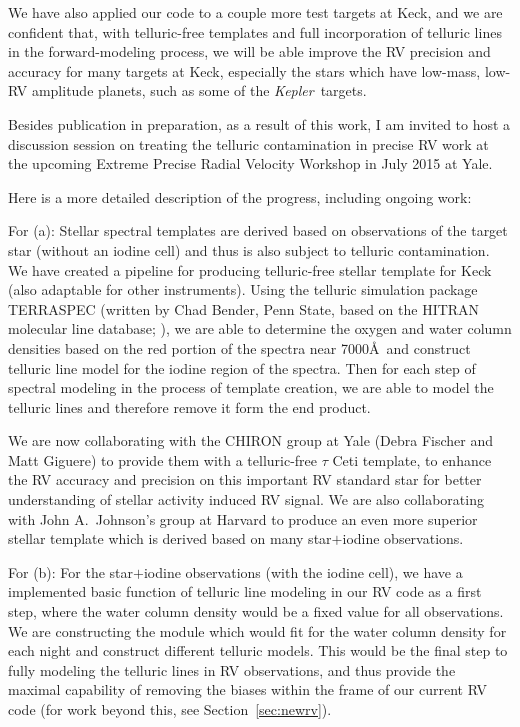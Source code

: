 \documentclass[12pt]{article}
\def\kepler{{\it Kepler}}
\begin{document}
We have also applied our code to a couple more test targets at Keck,
and we are confident that, with telluric-free templates and full
incorporation of telluric lines in the forward-modeling process, we
will be able improve the RV precision and accuracy for many targets at
Keck, especially the stars which have low-mass, low-RV amplitude
planets, such as some of the \kepler\ targets.

Besides publication in preparation, as a result of this work, I am
invited to host a discussion session on treating the telluric
contamination in precise RV work at the upcoming Extreme Precise
Radial Velocity Workshop in July 2015 at Yale.

Here is a more detailed description of the progress, including ongoing work:

For (a): Stellar spectral templates are derived based on observations
of the target star (without an iodine cell) and thus is also subject
to telluric contamination. We have created a pipeline for producing
telluric-free stellar template for Keck (also adaptable for other
instruments). Using the telluric simulation package TERRASPEC (written
by Chad Bender, Penn State, based on the HITRAN molecular line
database; \citealt{hitran2012}), we are able to determine the oxygen and water
column densities based on the red portion of the spectra near
7000\AA\ and construct telluric line model for the iodine region of
the spectra. Then for each step of spectral modeling in the process of
template creation, we are able to model the telluric lines and
therefore remove it form the end product.

We are now collaborating with the CHIRON group at Yale (Debra Fischer
and Matt Giguere) to provide them with a telluric-free $\tau$ Ceti
template, to enhance the RV accuracy and precision on this important
RV standard star for better understanding of stellar activity induced
RV signal. We are also collaborating with John A.\ Johnson's group at
Harvard to produce an even more superior stellar template which is
derived based on many star$+$iodine observations.

For (b): For the star$+$iodine observations (with the iodine cell), we
have a implemented basic function of telluric line modeling in our RV
code as a first step, where the water column density would be a fixed
value for all observations. We are constructing the module which would
fit for the water column density for each night and construct
different telluric models. This would be the final step to fully
modeling the telluric lines in RV observations, and thus provide the
maximal capability of removing the biases within the frame of our
current RV code (for work beyond this, see Section~\ref{sec:newrv}).
\end{document}
